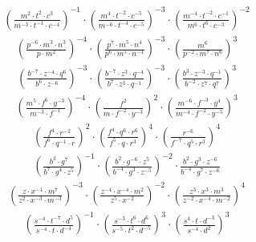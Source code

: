\begin{align}
\left(\frac{m^{2}\cdot t^{2}\cdot c^{3}}{m^{-3}\cdot t^{-1}\cdot c^{-4}}\right)^{-1}\cdot \left(\frac{m^{4}\cdot t^{-2}\cdot c^{-5}}{m^{-6}\cdot t^{-4}\cdot c^{-5}}\right)^{-3}\cdot \left(\frac{m^{-4}\cdot t^{-2}\cdot c^{-1}}{m^{6}\cdot t^{6}\cdot c^{-3}}\right)^{-2}
\end{align}
\begin{align}
\left(\frac{p^{-6}\cdot m^{3}\cdot n^{3}}{p\cdot m^{2}}\right)^{-4}\cdot \left(\frac{p^{7}\cdot m^{5}\cdot n^{4}}{p^{6}\cdot m^{5}\cdot n^{-1}}\right)^{-3}\cdot \left(\frac{m^{6}}{p^{-2}\cdot m^{7}\cdot n^{6}}\right)^{3}
\end{align}
\begin{align}
\left(\frac{b^{-7}\cdot z^{-4}\cdot q^{6}}{b^{6}\cdot z^{-6}}\right)^{-3}\cdot \left(\frac{b^{-7}\cdot z^{3}\cdot q^{-4}}{b^{7}\cdot z^{3}\cdot q^{-1}}\right)^{-3}\cdot \left(\frac{b^{3}\cdot z^{-3}\cdot q^{-1}}{b^{-2}\cdot z^{7}\cdot q^{7}}\right)^{3}
\end{align}
\begin{align}
\left(\frac{m^{5}\cdot f^{6}\cdot y^{-3}}{m^{-3}\cdot f^{-1}}\right)^{-4}\cdot \left(\frac{f^{2}}{m\cdot f^{-2}\cdot y^{-3}}\right)^{2}\cdot \left(\frac{m^{-6}\cdot f^{-3}\cdot y^{4}}{m^{-4}\cdot f^{-2}\cdot y^{-5}}\right)^{3}
\end{align}
\begin{align}
\left(\frac{f^{4}\cdot r^{-2}}{f^{6}\cdot q^{-1}\cdot r}\right)^{2}\cdot \left(\frac{f^{4}\cdot q^{6}\cdot r^{6}}{f^{5}\cdot q\cdot r^{3}}\right)^{4}\cdot \left(\frac{r^{-6}}{f^{-7}\cdot q^{5}\cdot r^{3}}\right)^{4}
\end{align}
\begin{align}
\left(\frac{b^{3}\cdot g^{7}}{b^{7}\cdot g^{4}\cdot z^{5}}\right)^{-1}\cdot \left(\frac{b^{2}\cdot g^{-6}\cdot z^{5}}{b^{-4}\cdot g^{3}\cdot z^{-5}}\right)^{-2}\cdot \frac{b^{2}\cdot g^{3}\cdot z^{-6}}{b^{-4}\cdot g^{7}\cdot z^{-6}}
\end{align}
\begin{align}
\left(\frac{z\cdot x^{-1}\cdot m^{7}}{z^{2}\cdot x^{-3}\cdot m^{-3}}\right)^{-3}\cdot \left(\frac{z^{-4}\cdot x^{-4}\cdot m^{2}}{z^{5}\cdot x^{-2}}\right)^{-2}\cdot \left(\frac{z^{3}\cdot x^{3}\cdot m^{3}}{z^{-2}\cdot x^{-4}\cdot m^{-2}}\right)^{4}
\end{align}
\begin{align}
\left(\frac{s^{-4}\cdot t^{-7}\cdot d^{5}}{s^{-4}\cdot t\cdot d^{-4}}\right)^{-1}\cdot \left(\frac{s^{-3}\cdot t^{6}\cdot d^{6}}{s^{-5}\cdot t^{2}\cdot d^{-5}}\right)^{3}\cdot \left(\frac{s^{4}\cdot t\cdot d^{-3}}{s^{-4}\cdot d^{2}}\right)^{3}
\end{align}
